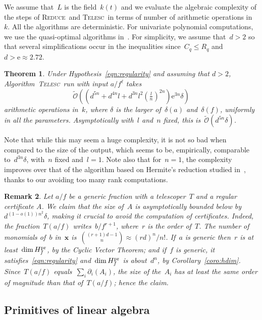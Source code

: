 \documentclass{sig-alternate}
\newtheorem{thm}{Theorem}
\newtheorem{remark}[thm]{Remark}
\newcommand{\tReduce}{\textsc{Reduce}}
\newcommand{\tCreatTel}{\textsc{Telesc}}
\newcommand{\softO}{\tilde{\mathcal{O}}}
\newcommand{\xx}{\mathbf{x}}
\newcommand{\pr}{{\smash{\mathrm{pr}}}}
\newcommand{\Hfp}{H_f^{\pr}}
\newcommand{\eexp}{\mathrm{e}}
\begin{document}
\noindent We assume that~$L$ is the field~$k(t)$ and 
we evaluate the algebraic complexity of the steps of \tReduce\ and \tCreatTel\ in terms of number of arithmetic operations in~$k$.
All the algorithms are deterministic.
For univariate polynomial computations, we use the quasi-optimal algorithms in~\cite{GatGer03}.
For simplicity, we assume that~$d>2$ so that several simplifications occur in the inequalities since~$C_q\leqslant R_q$ and $d>\eexp \approx 2.72$.
\begin{thm}\label{thm:complexity-reg}
Under Hypothesis~\eqref{eqn:regularity} and assuming that $d>2$, Algorithm~\tCreatTel\ run with input $a/f^\ell$ takes
  \begin{equation*}
    \softO\left( \left(d^{5n} + d^{4n}l  + d^{3n}l^2 \left(\tfrac{l}{n}\right)^{2n}\right)\eexp^{3n}\delta\right)
  \end{equation*}
arithmetic  operations in~$k$, where $\delta$ is the larger of~$\delta(a)$ and~$\delta(f)$, uniformly in all the parameters. Asymptotically with~$l$ and~$n$ fixed, this is~$\softO\left(d^{5n}\delta\right)$. 
\end{thm}
Note that while this may seem a huge complexity, it is not so bad when compared to the size of the output, which seems to be, empirically, comparable to~$d^{3n}\delta$, with~$n$ fixed and~$l=1$. 
Note also that for~$n=1$, the complexity improves over that of the algorithm based on Hermite's reduction studied in~\cite{BosCheChy10}, thanks to our avoiding too many rank computations.

\begin{remark}\label{rem:size-cert}\normalfont
Let $a/f$ be a generic fraction with a telescoper~$T$ and a regular certificate $A$.
We claim that the size of~$A$ is asymptotically bounded below by~$d^{(1-o(1))n^2} \delta$, making it crucial to avoid the computation of certificates.
Indeed, the fraction~$T(a/f)$ writes~$b/f^{r+1}$, where~$r$ is the order of~$T$.
The number of monomials of~$b$ in~$\xx$ is~$\binom{(r+1)d-1}{n}\approx(rd)^n/n!$.
  If~$a$ is generic then~$r$ is at least~$\dim\Hfp$, by the Cyclic Vector Theorem;
  and if~$f$ is generic, it satisfies~\eqref{eqn:regularity} and~$\dim\Hfp$ is about~$d^n$, by Corollary~\ref{coro:hdim}.
  Since~$T(a/f)$ equals~$\sum_i\partial_i(A_i)$, the size of the~$A_i$ has at least the same order of magnitude than that of~$T(a/f)$; hence the claim.
\end{remark}

\subsection{Primitives of linear algebra}\label{sec:pol-linalg}
\end{document}
